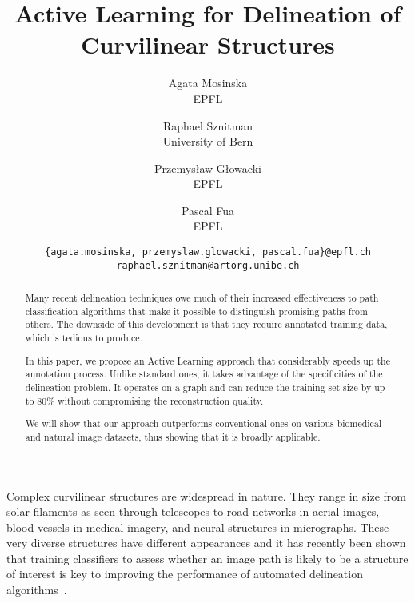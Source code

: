 \documentclass[10pt,twocolumn,letterpaper]{article}
\begin{document}
\title{Active Learning for Delineation of Curvilinear Structures}

\author{Agata Mosinska\\
EPFL\\
\and
Raphael Sznitman\\
University of Bern\\
\and
Przemys\l{}aw G\l{}owacki\\
EPFL\\
\and
Pascal Fua\\
EPFL\\
\and
{\tt\small  \{agata.mosinska, przemyslaw.glowacki, pascal.fua\}@epfl.ch raphael.sznitman@artorg.unibe.ch} 
}
\maketitle

\begin{abstract}
Many recent delineation techniques owe  much of their increased effectiveness to
path classification  algorithms that  make it possible to distinguish  promising paths
from others.   The downside of this  development is that they  require annotated
training data, which is tedious to produce.

In this paper,  we propose an Active Learning approach  that considerably speeds
up  the annotation  process. Unlike  standard ones,  it takes  advantage of  the
specificities of the delineation problem. It  operates on a graph and can reduce
the training  set size  by up  to 80\%  without compromising  the reconstruction
quality.

We  will  show  that  our  approach outperforms  conventional  ones  on  various
biomedical  and  natural  image  datasets,  thus  showing  that  it  is  broadly
applicable.
\end{abstract}


Complex curvilinear structures are widespread in nature. They range in size from
solar filaments  as seen through telescopes  to road networks in  aerial images,
blood vessels in  medical imagery, and neural structures  in micrographs.  These
very  diverse structures  have different  appearances and  it has  recently been
shown that training classifiers to assess whether  an image path is likely to be
a  structure of  interest  is  key to  improving  the  performance of  automated
delineation
algorithms~\cite{Turetken12,Turetken13a,Breitenreicher13,Santamaria-Pang15,Montoya-Zegarra14,Wegner15}.
\end{document}
